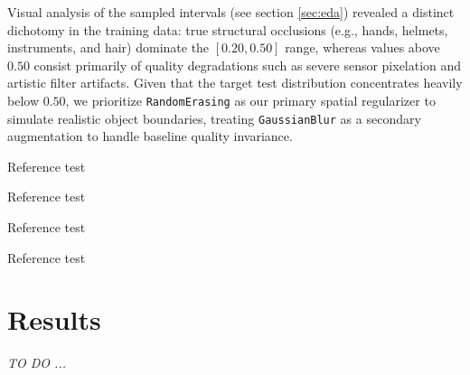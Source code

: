 \documentclass[10pt, twocolumn]{article}
\begin{document}
Visual analysis of the sampled intervals (see section \ref{sec:eda}) revealed a distinct dichotomy in the training data: true structural occlusions
(e.g., hands, helmets, instruments, and hair) dominate the $[0.20, 0.50]$ range, whereas values above $0.50$ consist primarily
of quality degradations such as severe sensor pixelation and artistic filter artifacts. Given that the target test distribution
concentrates heavily below $0.50$, we prioritize \texttt{RandomErasing} as our primary spatial regularizer to simulate realistic
object boundaries, treating \texttt{GaussianBlur} as a secondary augmentation to handle baseline quality invariance.


Reference test \cite{xu_comprehensive_2023}

Reference test \cite{chen_gridmask_2020}

Reference test \cite{chawla_smote_2002}

Reference test \cite{caruana_multitask_1997}
\section{Results}
\textit{TO DO ...}


\end{document}
